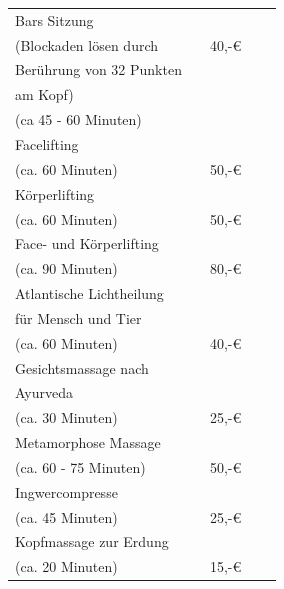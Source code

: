 \documentclass[10pt,foldmark,notumble]{leaflet}
\begin{document}
 \begin{tabular}{p{40mm}llcc}\hline\hline
Bars Sitzung              &     &  \\
(Blockaden lösen durch & & 40,-€ \\
Berührung von 32 Punkten & & \\
am Kopf) & & \\
(ca 45 - 60 Minuten)  &   &  \\
\hline
Facelifting   &   &  \\
(ca. 60 Minuten) & & 50,-€\\
\hline
Körperlifting   &   &  \\
(ca. 60 Minuten) & & 50,-€\\
\hline
Face- und Körperlifting   &   &  \\
(ca. 90 Minuten) & & 80,-€\\
 \hline
Atlantische Lichtheilung   &   &  \\
für Mensch und Tier & & \\
(ca. 60 Minuten) & & 40,-€ \\
\hline
Gesichtsmassage nach  &   &  \\
Ayurveda & & \\
(ca. 30 Minuten) & & 25,-€ \\
\hline
Metamorphose Massage  &   &  \\
(ca. 60 - 75 Minuten) & & 50,-€ \\
\hline
Ingwercompresse  &   &  \\
(ca. 45 Minuten) & & 25,-€ \\
\hline
Kopfmassage zur Erdung  &   &  \\
(ca. 20 Minuten) & & 15,-€ \\
\hline
\end{tabular}



\newpage
\end{document}
